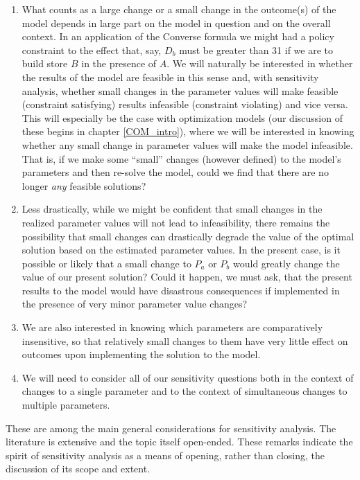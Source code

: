 \begin{enumerate}
\item What counts as a large change or a small change in the outcome(s) of the model depends in large part on the model in question and on the overall context. In an application of the Converse formula we might had a policy constraint to the effect that, say, $D_b$ must be greater than 31 if we are to build store $B$ in the presence of $A$. We will naturally be interested in whether the results of the model are feasible in this sense and, with sensitivity analysis, whether small changes in the parameter values will make feasible (constraint satisfying) results infeasible (constraint violating) and vice versa. This will especially be the case with optimization models
 (our discussion of these begins in chapter \ref{COM_intro}), where we will be interested in knowing whether any small change in parameter values will make the model infeasible.  That is, if we make some ``small'' changes (however defined) to the model's parameters and then re-solve the model, could we find that there are no longer \emph{any} feasible solutions?
\item Less drastically, while we might be confident that small changes in the realized parameter values will not lead to infeasibility, there remains the possibility that small changes can drastically degrade the value of the optimal solution based on the estimated parameter values. In the present case, is it possible or likely that a small change to $P_a$ or $P_b$ would greatly change the value of our  present solution?   Could it happen, we must ask, that the present results  to the model would have disastrous consequences if implemented in the presence of very minor parameter value changes?
\item We are also interested in knowing which parameters are comparatively insensitive, so that relatively small changes to them have very little effect on outcomes upon implementing the  solution to the model.
\item We will need to consider all of our sensitivity questions both in the context of changes to a single parameter and to the context of simultaneous changes to multiple parameters.
\end{enumerate}
These are among the main general considerations for sensitivity analysis. The literature is extensive and the topic itself open-ended. These remarks  indicate the spirit of sensitivity analysis as a means of opening, rather than closing, the discussion of its scope and extent.

